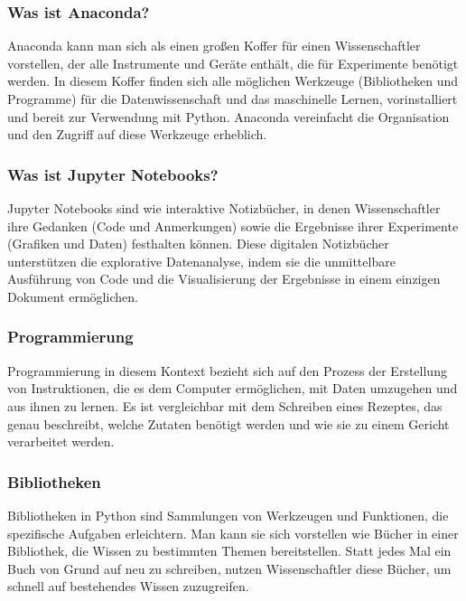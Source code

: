 \documentclass{vorlage-design-main}
\begin{document}
\subsubsection{Was ist Anaconda?}\label{was-ist-anaconda}

Anaconda kann man sich als einen großen Koffer für einen Wissenschaftler
vorstellen, der alle Instrumente und Geräte enthält, die für Experimente
benötigt werden. In diesem Koffer finden sich alle möglichen Werkzeuge
(Bibliotheken und Programme) für die Datenwissenschaft und das
maschinelle Lernen, vorinstalliert und bereit zur Verwendung mit Python.
Anaconda vereinfacht die Organisation und den Zugriff auf diese
Werkzeuge erheblich.

\subsubsection{Was ist Jupyter
Notebooks?}\label{was-ist-jupyter-notebooks}

Jupyter Notebooks sind wie interaktive Notizbücher, in denen
Wissenschaftler ihre Gedanken (Code und Anmerkungen) sowie die
Ergebnisse ihrer Experimente (Grafiken und Daten) festhalten können.
Diese digitalen Notizbücher unterstützen die explorative Datenanalyse,
indem sie die unmittelbare Ausführung von Code und die Visualisierung
der Ergebnisse in einem einzigen Dokument ermöglichen.

\subsubsection{Programmierung}\label{programmierung}

Programmierung in diesem Kontext bezieht sich auf den Prozess der
Erstellung von Instruktionen, die es dem Computer ermöglichen, mit Daten
umzugehen und aus ihnen zu lernen. Es ist vergleichbar mit dem Schreiben
eines Rezeptes, das genau beschreibt, welche Zutaten benötigt werden und
wie sie zu einem Gericht verarbeitet werden.

\subsubsection{Bibliotheken}\label{bibliotheken}

Bibliotheken in Python sind Sammlungen von Werkzeugen und Funktionen,
die spezifische Aufgaben erleichtern. Man kann sie sich vorstellen wie
Bücher in einer Bibliothek, die Wissen zu bestimmten Themen
bereitstellen. Statt jedes Mal ein Buch von Grund auf neu zu schreiben,
nutzen Wissenschaftler diese Bücher, um schnell auf bestehendes Wissen
zuzugreifen.
\end{document}
